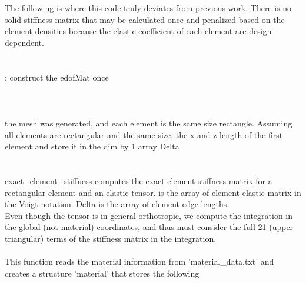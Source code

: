 The following is where this code truly deviates from previous work. There is no solid stiffness matrix that may be calculated once and penalized based on the element densities because the elastic coefficient of each element are design-dependent. \\
\tikzcircle{2pt}\indent{}\\
\tikzcircle{2pt}\indent{}\\
\indent\indent{}: construct the edofMat once\\
\indent\indent{} \\
\indent\indent{} \\
\indent\indent{}\\
the mesh was generated, and each element is the same size rectangle. Assuming all elements are rectangular and the same size, the x and z length of the first element and store it in the dim by 1 array Delta \\
\indent\indent\indent{} \\
\indent\indent\indent{} \\
exact\_element\_stiffness computes the exact element stiffness matrix for a rectangular element and an elastic tensor.  is the  array of element elastic matrix in the Voigt notation. Delta is the array of element edge lengths. \\
Even though the tensor is in general orthotropic, we compute the integration in the global (not material) coordinates, and thus must consider the full 21 (upper triangular) terms of the stiffness matrix in the integration. \\
\tikzcircle{2pt}\indent{} \\
This function reads the material information from 'material\_data.txt' and creates a structure 'material' that stores the following \\
\indent\indent\indent{} \\
\indent\indent\indent{} \\
\indent\indent\indent{} \\


